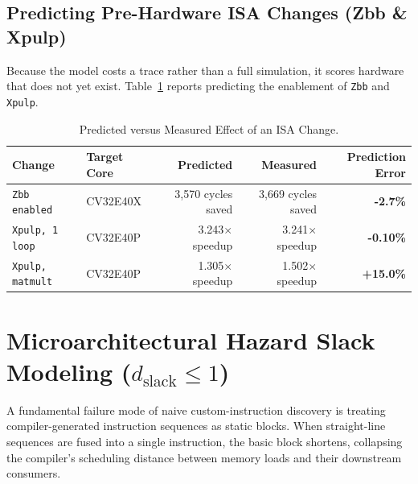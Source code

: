 \documentclass[11pt,a4paper]{article}
\begin{document}
\subsection{Predicting Pre-Hardware ISA Changes (Zbb \& Xpulp)}
Because the model costs a trace rather than a full simulation, it scores hardware that does not yet exist. Table~\ref{tab:isa_changes} reports predicting the enablement of \texttt{Zbb} and \texttt{Xpulp}.

\begin{table}[h!]
\centering
\small
\begin{tabular}{l l r r r}
\toprule
\textbf{Change} & \textbf{Target Core} & \textbf{Predicted} & \textbf{Measured} & \textbf{Prediction Error} \\
\midrule
\texttt{Zbb enabled}    & CV32E40X & 3,570 cycles saved & 3,669 cycles saved & \textbf{-2.7\%} \\
\texttt{Xpulp, 1 loop}  & CV32E40P & 3.243$\times$ speedup & 3.241$\times$ speedup & \textbf{-0.10\%} \\
\texttt{Xpulp, matmult} & CV32E40P & 1.305$\times$ speedup & 1.502$\times$ speedup & \textbf{+15.0\%} \\
\bottomrule
\end{tabular}
\caption{Predicted versus Measured Effect of an ISA Change.}
\label{tab:isa_changes}
\end{table}

\clearpage
\section{Microarchitectural Hazard Slack Modeling ($d_{\text{slack}} \le 1$)}

A fundamental failure mode of naive custom-instruction discovery is treating compiler-generated instruction sequences as static blocks. When straight-line sequences are fused into a single instruction, the basic block shortens, collapsing the compiler's scheduling distance between memory loads and their downstream consumers.
\end{document}
